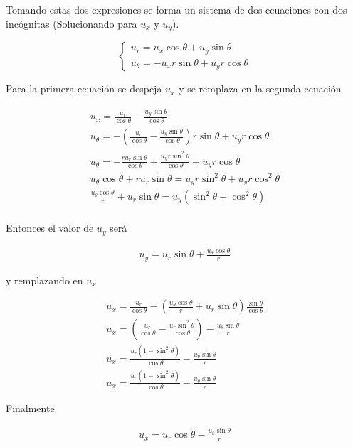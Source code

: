 Tomando estas dos expresiones se forma un sistema de dos ecuaciones con dos incógnitas (Solucionando para $u_x$ y $u_y$).

\begin{equation*}
    \left\{\begin{matrix}
        u_r = u_x\cos\theta + u_y\sin\theta\\
        u_\theta = - u_x r\sin\theta + u_yr\cos\theta
    \end{matrix}\right.
\end{equation*}


Para la primera ecuación se despeja $u_x$ y se remplaza en la segunda ecuación 

\begin{gather*}
    u_x = \frac{u_r}{\cos\theta} - \frac{u_y\sin\theta}{\cos\theta}\\
    u_\theta = - \left(\frac{u_r}{\cos\theta} - \frac{u_y\sin\theta}{\cos\theta}\right) r\sin\theta + u_yr\cos\theta\\
    u_\theta =  -\frac{ru_r\sin\theta}{\cos\theta} + \frac{u_yr\sin^2\theta}{\cos\theta}  + u_yr\cos\theta\\
    u_\theta \cos\theta + ru_r\sin\theta = u_yr\sin^2\theta  + u_yr\cos^2\theta\\
    \frac{u_\theta \cos\theta}{r} + u_r\sin\theta = u_y(\sin^2\theta  +\cos^2\theta)\\
\end{gather*}

Entonces el valor de $u_y$ será 

\begin{mdframed}
    \vspace{-0.25cm}
    \begin{gather}
        u_y = u_r\sin\theta + \frac{u_\theta \cos\theta}{r}
    \end{gather}
    \vspace{-0.3cm}
\end{mdframed}

y remplazando en $u_x$

\begin{gather*}
    u_x = \frac{u_r}{\cos\theta} - \left(\frac{u_\theta \cos\theta}{r} + u_r\sin\theta \right)\frac{\sin\theta}{\cos\theta}\\
    u_x = \left(\frac{u_r}{\cos\theta} -  \frac{u_r\sin^2\theta}{\cos\theta}\right) - \frac{u_\theta\sin\theta}{r} \\
    u_x = \frac{u_r(1-\sin^2\theta)}{\cos\theta}  - \frac{u_\theta\sin\theta}{r} \\
    u_x = \frac{u_r(1-\sin^2\theta)}{\cos\theta}  - \frac{u_\theta\sin\theta}{r}
\end{gather*}

Finalmente 

\begin{mdframed}
    \vspace{-0.25cm}
    \begin{gather}
        u_x = u_r\cos\theta  - \frac{u_\theta\sin\theta}{r}
\end{gather}
    \vspace{-0.3cm}
\end{mdframed}